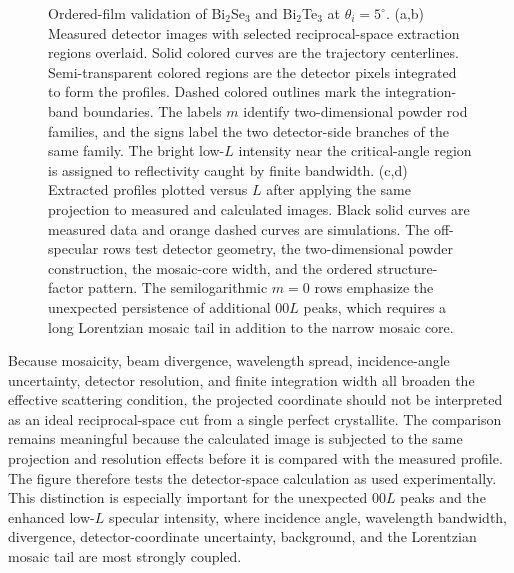 \begin{figure}[H]
  \begin{minipage}[t]{0.48\linewidth}
    \centering
  \end{minipage}\hfill
  \begin{minipage}[t]{0.48\linewidth}
    \centering
  \end{minipage}
  \caption[Ordered-film validation for Bi2Se3 and Bi2Te3]{Ordered-film validation of Bi$_2$Se$_3$ and Bi$_2$Te$_3$ at $\theta_i=5^\circ$. (a,b) Measured detector images with selected reciprocal-space extraction regions overlaid. Solid colored curves are the trajectory centerlines. Semi-transparent colored regions are the detector pixels integrated to form the profiles. Dashed colored outlines mark the integration-band boundaries. The labels $m$ identify two-dimensional powder rod families, and the signs label the two detector-side branches of the same family. The bright low-$L$ intensity near the critical-angle region is assigned to reflectivity caught by finite bandwidth. (c,d) Extracted profiles plotted versus $L$ after applying the same projection to measured and calculated images. Black solid curves are measured data and orange dashed curves are simulations. The off-specular rows test detector geometry, the two-dimensional powder construction, the mosaic-core width, and the ordered structure-factor pattern. The semilogarithmic $m=0$ rows emphasize the unexpected persistence of additional $00L$ peaks, which requires a long Lorentzian mosaic tail in addition to the narrow mosaic core.}
  \label{fig:ordered_chalcogenide_validation}
\end{figure}

Because mosaicity, beam divergence, wavelength spread, incidence-angle uncertainty, detector resolution, and finite integration width all broaden the effective scattering condition, the projected coordinate should not be interpreted as an ideal reciprocal-space cut from a single perfect crystallite. The comparison remains meaningful because the calculated image is subjected to the same projection and resolution effects before it is compared with the measured profile. The figure therefore tests the detector-space calculation as used experimentally. This distinction is especially important for the unexpected $00L$ peaks and the enhanced low-$L$ specular intensity, where incidence angle, wavelength bandwidth, divergence, detector-coordinate uncertainty, background, and the Lorentzian mosaic tail are most strongly coupled.

